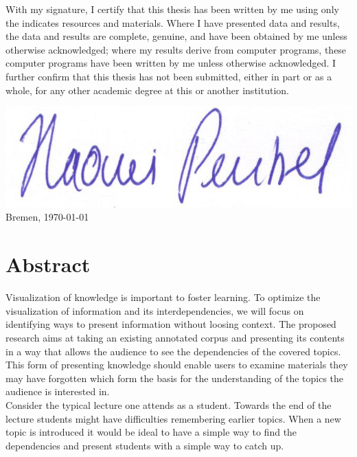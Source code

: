 \documentclass[twoside]{article}
\begin{document}
\newpage
\noindent
  With my signature, I certify that this thesis has been written by me
  using only the indicates resources and materials. Where I have
  presented data and results, the data and results are complete,
  genuine, and have been obtained by me unless otherwise acknowledged;
  where my results derive from computer programs, these computer
  programs have been written by me unless otherwise acknowledged. I
  further confirm that this thesis has not been submitted, either in
  part or as a whole, for any other academic degree at this or another
  institution.

  \vspace{20mm}

    \includegraphics[scale=0.2]{Signature}
 \hfill Bremen, \today
  
\newpage

\thispagestyle{fancy} %


 \section*{Abstract}
Visualization of knowledge is important to foster learning. To optimize the visualization of information and its interdependencies, we will focus on identifying ways to present information without loosing context. The proposed research aims at taking an existing annotated corpus and presenting its contents in a way that allows the audience to see the dependencies of the covered topics. This form of presenting knowledge should enable users to examine materials they may have forgotten which form the basis for the understanding of the topics the audience is interested in.\\

Consider the typical lecture one attends as a student. Towards the end of the lecture students might have difficulties remembering earlier topics. When a new topic is introduced it would be ideal to have a simple way to find the dependencies and present students with a simple way to catch up.\\
\end{document}
